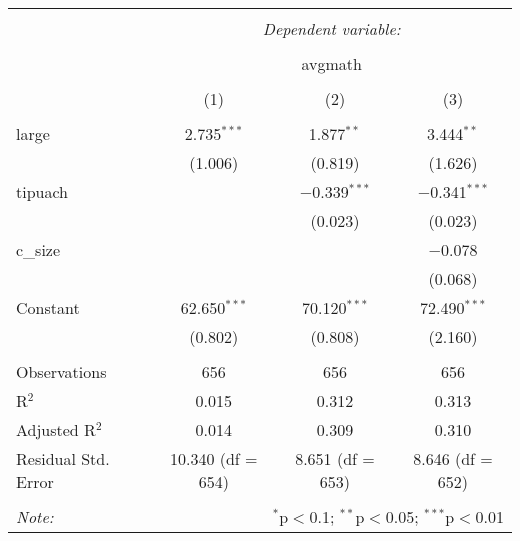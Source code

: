 
\begin{table}[!htbp] \centering 
  \caption{} 
  \label{} 
\begin{tabular}{@{\extracolsep{5pt}}lccc} 
\\[-1.8ex]\hline 
\hline \\[-1.8ex] 
 & \multicolumn{3}{c}{\textit{Dependent variable:}} \\ 
\cline{2-4} 
\\[-1.8ex] & \multicolumn{3}{c}{avgmath} \\ 
\\[-1.8ex] & (1) & (2) & (3)\\ 
\hline \\[-1.8ex] 
 large & 2.735$^{***}$ & 1.877$^{**}$ & 3.444$^{**}$ \\ 
  & (1.006) & (0.819) & (1.626) \\ 
  tipuach &  & $-$0.339$^{***}$ & $-$0.341$^{***}$ \\ 
  &  & (0.023) & (0.023) \\ 
  c\_size &  &  & $-$0.078 \\ 
  &  &  & (0.068) \\ 
  Constant & 62.650$^{***}$ & 70.120$^{***}$ & 72.490$^{***}$ \\ 
  & (0.802) & (0.808) & (2.160) \\ 
 \hline \\[-1.8ex] 
Observations & 656 & 656 & 656 \\ 
R$^{2}$ & 0.015 & 0.312 & 0.313 \\ 
Adjusted R$^{2}$ & 0.014 & 0.309 & 0.310 \\ 
Residual Std. Error & 10.340 (df = 654) & 8.651 (df = 653) & 8.646 (df = 652) \\ 
\hline 
\hline \\[-1.8ex] 
\textit{Note:}  & \multicolumn{3}{r}{$^{*}$p$<$0.1; $^{**}$p$<$0.05; $^{***}$p$<$0.01} \\ 
\end{tabular} 
\end{table} 
